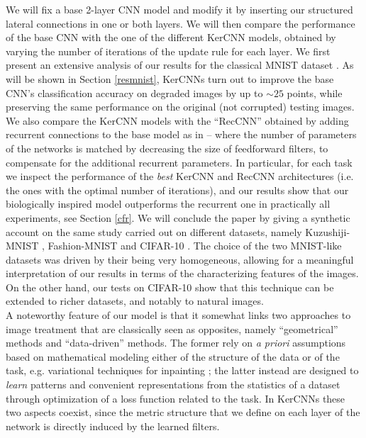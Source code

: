 \documentclass[11pt,oneside,reqno]{amsart}
\begin{document}
  We will fix a base 2-layer CNN model and modify it by inserting our structured lateral connections in one or both layers. We will then compare the performance of the base CNN with the one of the different KerCNN models, obtained by varying the number of iterations of the update rule for each layer. We first present an extensive analysis of our results for the classical MNIST dataset \citep{mnist}. As will be shown in Section \ref{resmnist}, KerCNNs turn out to improve the base CNN's classification accuracy on degraded images by up to $\sim25$ points, while preserving the same performance on the original (not corrupted) testing images. We also compare the KerCNN models with the ``RecCNN'' obtained by adding recurrent connections to the base model as in \citet{spoerer} -- where the number of parameters of the networks is matched by decreasing the size of feedforward filters, to compensate for the additional recurrent parameters. In particular, for each task we inspect the performance of the \emph{best} KerCNN and RecCNN architectures (i.e. the ones with the optimal number of iterations), and our results show that our biologically inspired model outperforms the recurrent one in practically all experiments, see Section \ref{cfr}. We will conclude the paper by giving a synthetic account on the same study carried out on different datasets, namely Kuzushiji-MNIST \citep{kmnist}, Fashion-MNIST \citep{fashion} and CIFAR-10 \citep{cifar}. The choice of the two MNIST-like datasets was driven by their being very homogeneous, allowing for a meaningful interpretation of our results in terms of the characterizing features of the images. On the other hand, our tests on CIFAR-10 show that this technique can be extended to richer datasets, and notably to natural images.\\
  A noteworthy feature of our model is that it somewhat links two approaches to image treatment that are classically seen as opposites, namely ``geometrical'' methods and ``data-driven'' methods. The former rely on \emph{a priori} assumptions based on mathematical modeling either of the structure of the data or of the task, e.g. variational techniques for inpainting \citep{ambmasn,inpainting}; the latter instead are designed to \emph{learn} patterns and convenient representations from the statistics of a dataset through optimization of a loss function related to the task. In KerCNNs these two aspects coexist, since the metric structure that we define on each layer of the network is directly induced by the learned filters.
 
\end{document}

